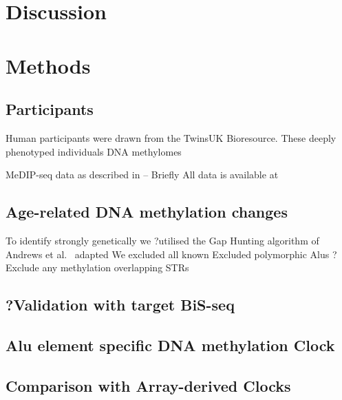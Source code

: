 \documentclass[]{book}
\begin{document}
\newpage

\hypertarget{discussion-3}{%
\chapter{Discussion}\label{discussion-3}}

\newpage

\hypertarget{methods-3}{%
\chapter{Methods}\label{methods-3}}

\hypertarget{participants-1}{%
\section{Participants}\label{participants-1}}

Human participants were drawn from the TwinsUK Bioresource.
These deeply phenotyped individuals DNA methylomes

MeDIP-seq data as described in \citep{Bell2017a} -- Briefly All data is available at

\hypertarget{age-related-dna-methylation-changes}{%
\section{Age-related DNA methylation changes}\label{age-related-dna-methylation-changes}}

To identify strongly genetically we ?utilised the Gap Hunting algorithm of Andrews et al.~\citep{Andrews2016} adapted
We excluded all known
Excluded polymorphic Alus \citep{Payer2017}
?Exclude any methylation overlapping STRs

\hypertarget{validation-with-target-bis-seq}{%
\section{?Validation with target BiS-seq}\label{validation-with-target-bis-seq}}

\hypertarget{alu-element-specific-dna-methylation-clock-1}{%
\section{Alu element specific DNA methylation Clock}\label{alu-element-specific-dna-methylation-clock-1}}

\hypertarget{comparison-with-array-derived-clocks}{%
\section{Comparison with Array-derived Clocks}\label{comparison-with-array-derived-clocks}}
\end{document}
